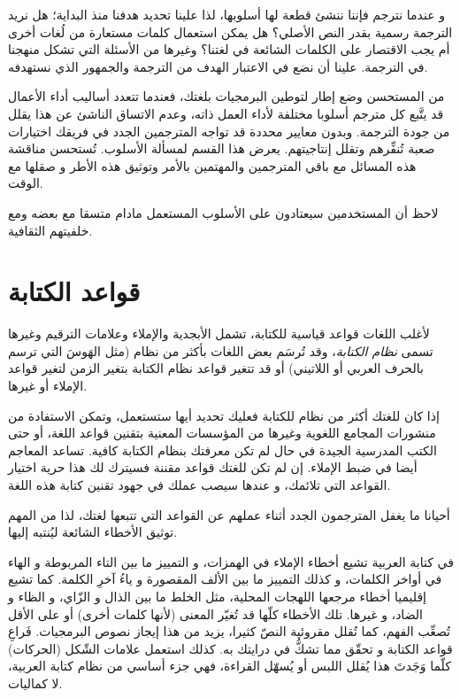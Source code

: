 و عندما نترجم فإننا ننشئ قطعة لها أسلوبها، لذا علينا تحديد هدفنا منذ
البداية؛ هل نريد الترجمة رسمية بقدر النص الأصلي؟ هل يمكن استعمال كلمات
مستعارة من لُغات أخرى أم يجب الاقتصار على الكلمات الشائعة في لغتنا؟
وغيرها من الأسئلة التي تشكل منهجنا في الترجمة. علينا أن نضع في الاعتبار
الهدف من الترجمة والجمهور الذي نستهدفه.

من المستحسن وضع إطار لتوطين البرمجيات بلغتك، فعندما تتعدد أساليب أداء
الأعمال قد يتَّبع كل مترجم أسلوبا مختلفة لأداء العمل ذاته، وعدم الاتساق
الناشئ عن هذا يقلل من جودة الترجمة. وبدون معايير محددة قد تواجه
المترجمين الجدد في فريقك اختيارات صعبة تُنفِّرهم وتقلل إنتاجيتهم. يعرض
هذا القسم لمسألة الأسلوب. تُستحسن مناقشة هذه المسائل مع باقي المترجمين
والمهتمين بالأمر وتوثيق هذه الأطر و صقلها مع الوقت.

لاحظ أن المستخدمين سيعتادون على الأسلوب المستعمل مادام متسقا مع بعضه ومع
خلفيتهم الثقافية.

\section{قواعد الكتابة}
لأغلب اللغات قواعد قياسية للكتابة، تشمل الأبجدية والإملاء وعلامات
الترقيم وغيرها تسمى {\it نظام الكتابة}، وقد تُرسَم بعض اللغات بأكثر من
نظام (مثل الهَوسَ التي ترسم بالحرف العربي أو اللاتيني) أو قد تتغير
قواعد نظام الكتابة بتغير الزمن لتغير قواعد الإملاء أو غيرها.

إذا كان للغتك أكثر من نظام للكتابة فعليك تحديد أيها ستستعمل، وتمكن
الاستفادة من منشورات المجامع اللغوية وغيرها من المؤسسات المعنية بتقنين
قواعد اللغة، أو حتى الكتب المدرسية الجيدة في حال لم تكن معرفتك بنظام
الكتابة كافية. تساعد المعاجم أيضا في ضبط الإملاء. إن لم تكن للغتك قواعد
مقننة فسيترك لك هذا حرية اختيار القواعد التي تلائمك، و عندها سيصب عملك
في جهود تقنين كتابة هذه اللغة.

أحيانا ما يغفل المترجمون الجدد أثناء عملهم عن القواعد التي تتبعها لغتك،
لذا من المهم توثيق الأخطاء الشائعة ليُنتبه إليها.

في كتابة العربية تشيع أخطاء الإملاء في الهمزات، و التمييز ما بين التاء
المربوطة و الهاء في أواخر الكلمات، و كذلك التمييز ما بين الألف المقصورة
و ياءُ آخرِ الكلمة. كما تشيع إقليميا أخطاء مرجعها اللهجات المحلية، مثل
الخلط ما بين الذال و الزّاي، و الظاء و الضاد، و غيرها. تلك الأخطاء
كلّها قد تُغيّر المعنى (لأنها كلمات أخرى) أو على اﻷقل تُصعِّب الفهم،
كما تُقلل مقروئية النصّ كثيرا، يزيد من هذا إيجاز نصوص البرمجيات. فَراعِ
قواعد الكتابة و تحقّق مما تشكُّ في درايتك به. كذلك استعمل علامات الشّكل
(الحركات) كلّما وَجَدتَ هذا يُقلل اللبس أو يُسهّل القراءة، فهي جزء
أساسي من نظام كتابة العربية، لا كماليات.

